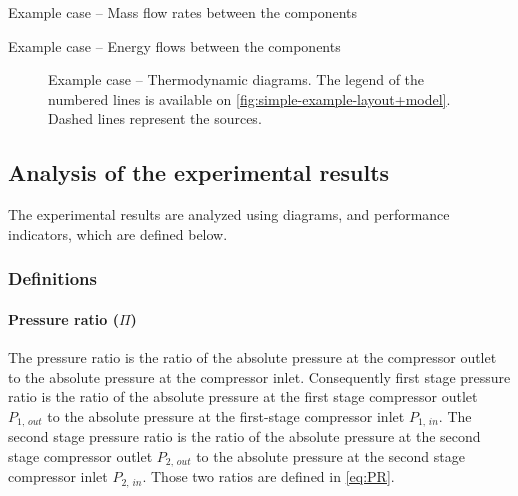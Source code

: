 \begin{table}[htb]
    \footnotesize
    \begin{center}
    
  \end{center}
  \caption{Example case -- Mass flow rates between the components}
  \label{tab:simple-example-dotM}
\end{table}

\begin{table}[htb]
    \footnotesize
    \begin{center}
    
  \end{center}
  \caption{Example case -- Energy flows between the components}
  \label{tab:simple-example-dotEQ}
\end{table}

\begin{figure}[htb]
  \centering
  \hspace{1em}
  \caption[Example case -- Thermodynamic diagrams]{Example case --
    Thermodynamic diagrams. The legend of the numbered lines is
    available on \cref{fig:simple-example-layout+model}. Dashed lines
    represent the sources.}
  \label{fig:simple-example-diagrams}
\end{figure}

\subsection{Analysis of the experimental results}
\label{sec:methodo-analysis}

The experimental results are analyzed using diagrams, and performance
indicators, which are defined below.

\subsubsection{Definitions}
\label{sec:methodo-defs}

\paragraph{Pressure ratio ($\Pi$)}

The pressure ratio is the ratio of the absolute pressure at the
compressor outlet to the absolute pressure at the compressor
inlet. Consequently first stage pressure ratio is the ratio of the
absolute pressure at the first stage compressor outlet $P_{1,\,out}$
to the absolute pressure at the first-stage compressor inlet
$P_{1,\,in}$. The second stage pressure ratio is the ratio of the
absolute pressure at the second stage compressor outlet $P_{2,\,out}$
to the absolute pressure at the second stage compressor inlet
$P_{2,\,in}$. Those two ratios are defined in \cref{eq:PR}.

